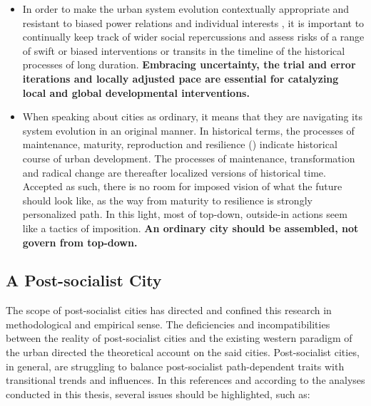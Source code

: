 \documentclass[11pt]{report}
\begin{document}
{\begin{itemize}
\item 
In order to make the urban system evolution contextually appropriate  and resistant to biased power relations and individual interests , it is important to continually keep track of wider social repercussions and assess risks of a range of swift or biased interventions or
transits in the timeline of the historical processes of long duration.
\textbf{Embracing uncertainty, the trial and error iterations and locally adjusted pace are essential for catalyzing local and global developmental interventions.}

\item
When speaking about cities as ordinary, it means that they are navigating its system evolution in an original manner.
In historical terms, the processes of maintenance, maturity, reproduction and resilience (\href{Galtung}{\citealt{galtung_peace_1996}}) indicate historical course of urban development.
The processes of maintenance, transformation and radical change are thereafter localized versions of historical time.
Accepted as such, there is no room for imposed vision of what the future should look like, as the way from maturity to resilience is strongly personalized path. 
In this light, most of top-down, outside-in actions seem like a tactics of imposition. \textbf{An ordinary city should be assembled, not govern from top-down.}

\end{itemize}

\subsection{A Post-socialist City}

The scope of post-socialist cities has directed and confined this research in methodological and empirical sense.
The deficiencies and incompatibilities between the reality of post-socialist cities and the existing western paradigm of the urban directed the theoretical account on the said cities.
Post-socialist cities, in general, are struggling to balance post-socialist path-dependent traits with transitional trends and influences.
In this references and according to the analyses conducted in this thesis, several issues should be highlighted, such as:

}
\end{document}
